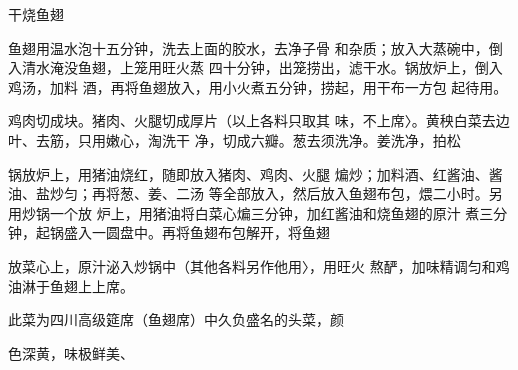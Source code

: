 \begin{recipe}{干烧鱼翅}

\ingredients


\cooking

\step 	鱼翅用温水泡十五分钟，洗去上面的胶水，去净子骨 和杂质；放入大蒸碗中，倒入清水淹没鱼翅，上笼用旺火蒸 四十分钟，出笼捞出，滤干水。锅放炉上，倒入鸡汤，加料 酒，再将鱼翅放入，用小火煮五分钟，捞起，用干布一方包 起待用。

\step 	鸡肉切成块。猪肉、火腿切成厚片（以上各料只取其 味，不上席〉。黄秧白菜去边叶、去筋，只用嫩心，淘洗干 净，切成六瓣。葱去须洗净。姜洗净，拍松

\step 	锅放炉上，用猪油烧红，随即放入猪肉、鸡肉、火腿 煸炒；加料酒、红酱油、酱油、盐炒匀；再将葱、姜、二汤 等全部放入，然后放入鱼翅布包，煨二小时。另用炒锅一个放 炉上，用猪油将白菜心煸三分钟，加红酱油和烧鱼翅的原汁 煮三分钟，起锅盛入一圆盘中。再将鱼翅布包解开，将鱼翅

放菜心上，原汁泌入炒锅中（其他各料另作他用〉，用旺火 熬酽，加味精调匀和鸡油淋于鱼翅上上席。

\notes

此菜为四川高级筵席（鱼翅席）中久负盛名的头菜，颜

色深黄，味极鲜美、

\end{recipe}

